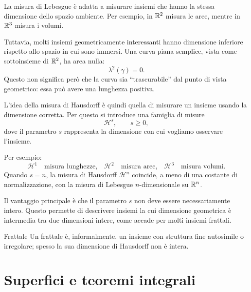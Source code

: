 \documentclass[a4paper]{article}
\begin{document}
\begin{radioactive}
    La misura di Lebesgue è adatta a misurare insiemi che hanno la stessa
    dimensione dello spazio ambiente. Per esempio, in \(\mathbb{R}^2\)
    misura le aree, mentre in \(\mathbb{R}^3\) misura i volumi.

    Tuttavia, molti insiemi geometricamente interessanti hanno dimensione
    inferiore rispetto allo spazio in cui sono immersi. Una curva piana semplice,
    vista come sottoinsieme di \(\mathbb{R}^2\), ha area nulla:
    \[
        \lambda^2(\gamma)=0.
    \]
    Questo non significa però che la curva sia ``trascurabile'' dal punto di vista
    geometrico: essa può avere una lunghezza positiva.

    L'idea della misura di Hausdorff è quindi quella di misurare un insieme usando
    la dimensione corretta. Per questo si introduce una famiglia di misure
    \[
        \mathcal H^s,
        \qquad s\geq 0,
    \]
    dove il parametro \(s\) rappresenta la dimensione con cui vogliamo osservare
    l'insieme.

    Per esempio:
    \[
        \mathcal H^1
        \quad\text{misura lunghezze,}
        \quad
        \mathcal H^2
        \quad\text{misura aree,}
        \quad
        \mathcal H^3
        \quad\text{misura volumi.}
    \]
    Quando \(s=n\), la misura di Hausdorff \(\mathcal H^n\) coincide, a meno di una
    costante di normalizzazione, con la misura di Lebesgue \(n\)-dimensionale su
    \(\mathbb{R}^n\).

    Il vantaggio principale è che il parametro \(s\) non deve essere necessariamente
    intero. Questo permette di descrivere insiemi la cui dimensione geometrica è
    intermedia tra due dimensioni intere, come accade per molti insiemi frattali.
\end{radioactive}

\begin{radioactive}
\begin{snippetdefinition}{Frattale}
    Un frattale è, informalmente, un insieme con struttura fine autosimile o irregolare; spesso la sua dimensione di Hausdorff non è intera.
\end{snippetdefinition}
\end{radioactive}

\pagebreak

\part{Superfici e teoremi integrali}
\end{document}
